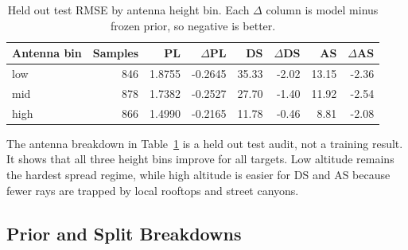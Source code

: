 \documentclass[journal]{IEEEtran}
\begin{document}
\begin{table}[!t]
\centering
\caption{Held out test RMSE by antenna height bin. Each \(\Delta\) column is
model minus frozen prior, so negative is better.}
\label{tab:antenna-breakdown}
\scriptsize
\setlength{\tabcolsep}{4pt}
\begin{tabular}{lrrrrrrr}
\toprule
Antenna bin & Samples & PL & \(\Delta\)PL & DS & \(\Delta\)DS & AS & \(\Delta\)AS \\
\midrule
low & 846 & 1.8755 & -0.2645 & 35.33 & -2.02 & 13.15 & -2.36 \\
mid & 878 & 1.7382 & -0.2527 & 27.70 & -1.40 & 11.92 & -2.54 \\
high & 866 & 1.4990 & -0.2165 & 11.78 & -0.46 & 8.81 & -2.08 \\
\bottomrule
\end{tabular}
\end{table}

The antenna breakdown in Table~\ref{tab:antenna-breakdown} is a held out test
audit, not a training result. It shows that all three height bins improve for
all targets. Low altitude remains the hardest spread regime, while high altitude
is easier for DS and AS because fewer rays are trapped by local rooftops and
street canyons.

\subsection{Prior and Split Breakdowns}
\end{document}
